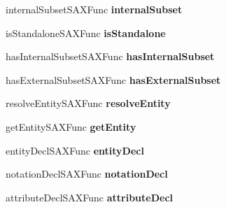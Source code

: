 \begin{DoxyCompactItemize}
\item 
\hypertarget{struct__xml_s_a_x_handler_v1_a42f4e20c793c236300b6101d49212580}{internal\-Subset\-S\-A\-X\-Func {\bfseries internal\-Subset}}\label{struct__xml_s_a_x_handler_v1_a42f4e20c793c236300b6101d49212580}

\item 
\hypertarget{struct__xml_s_a_x_handler_v1_a4b9bd1931ab440bd5b7d9df8009440bc}{is\-Standalone\-S\-A\-X\-Func {\bfseries is\-Standalone}}\label{struct__xml_s_a_x_handler_v1_a4b9bd1931ab440bd5b7d9df8009440bc}

\item 
\hypertarget{struct__xml_s_a_x_handler_v1_afe7c41e644a1152afd4bc13fe56a60de}{has\-Internal\-Subset\-S\-A\-X\-Func {\bfseries has\-Internal\-Subset}}\label{struct__xml_s_a_x_handler_v1_afe7c41e644a1152afd4bc13fe56a60de}

\item 
\hypertarget{struct__xml_s_a_x_handler_v1_a0ca8a76baf0d76b04d914ad9a56c4506}{has\-External\-Subset\-S\-A\-X\-Func {\bfseries has\-External\-Subset}}\label{struct__xml_s_a_x_handler_v1_a0ca8a76baf0d76b04d914ad9a56c4506}

\item 
\hypertarget{struct__xml_s_a_x_handler_v1_a949a9307787020339ed0d46376a676ea}{resolve\-Entity\-S\-A\-X\-Func {\bfseries resolve\-Entity}}\label{struct__xml_s_a_x_handler_v1_a949a9307787020339ed0d46376a676ea}

\item 
\hypertarget{struct__xml_s_a_x_handler_v1_a6d00cd90884aff134c70cfed77798cdb}{get\-Entity\-S\-A\-X\-Func {\bfseries get\-Entity}}\label{struct__xml_s_a_x_handler_v1_a6d00cd90884aff134c70cfed77798cdb}

\item 
\hypertarget{struct__xml_s_a_x_handler_v1_ab8767df981b572d1a4bb72de4eece794}{entity\-Decl\-S\-A\-X\-Func {\bfseries entity\-Decl}}\label{struct__xml_s_a_x_handler_v1_ab8767df981b572d1a4bb72de4eece794}

\item 
\hypertarget{struct__xml_s_a_x_handler_v1_a46b3e77687757223f11de89d19290e78}{notation\-Decl\-S\-A\-X\-Func {\bfseries notation\-Decl}}\label{struct__xml_s_a_x_handler_v1_a46b3e77687757223f11de89d19290e78}

\item 
\hypertarget{struct__xml_s_a_x_handler_v1_a0624527c2beaba134403534d02e4820f}{attribute\-Decl\-S\-A\-X\-Func {\bfseries attribute\-Decl}}\label{struct__xml_s_a_x_handler_v1_a0624527c2beaba134403534d02e4820f}


\end{DoxyCompactItemize}
